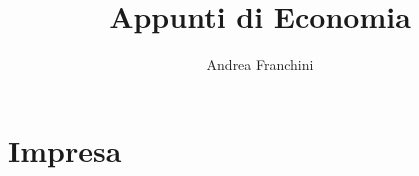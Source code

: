\documentclass[10pt,a4paper,fleqn,oneside]{book}
\title{Appunti di Economia}
\author{Andrea Franchini}
\begin{document}
\maketitle
\tableofcontents

\chapter{Impresa}
\end{document}

